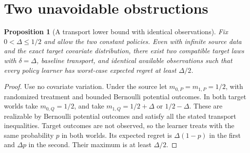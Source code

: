 \documentclass[11pt]{article}
\newtheorem{proposition}[theorem]{Proposition}
\theoremstyle{remark}
\begin{document}
\section{Two unavoidable obstructions}
\begin{proposition}[A transport lower bound with identical observations]
Fix $0<\Delta\leq1/2$ and allow the two constant policies. Even with infinite source data and the exact target covariate distribution, there exist two compatible target laws with $\delta=\Delta$, baseline transport, and identical available observations such that every policy learner has worst-case expected regret at least $\Delta/2$.
\end{proposition}
\begin{proof}
Use no covariate variation. Under the source let $m_{0,P}=m_{1,P}=1/2$, with randomized treatment and bounded Bernoulli potential outcomes. In both target worlds take $m_{0,Q}=1/2$, and take $m_{1,Q}=1/2+\Delta$ or $1/2-\Delta$. These are realizable by Bernoulli potential outcomes and satisfy all the stated transport inequalities. Target outcomes are not observed, so the learner treats with the same probability $p$ in both worlds. Its expected regret is $\Delta(1-p)$ in the first and $\Delta p$ in the second. Their maximum is at least $\Delta/2$.
\end{proof}
\end{document}
